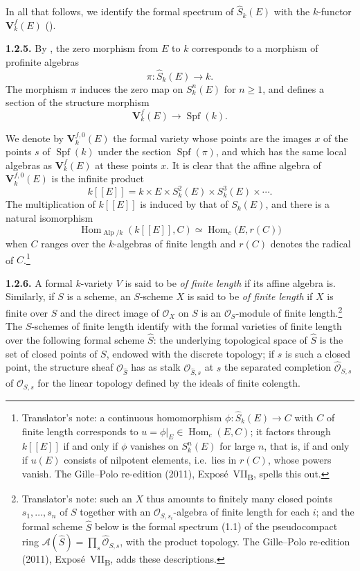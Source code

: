 In all that follows, we identify the formal spectrum of
\(\widehat S_k(E)\) with the \(k\)-functor \(\mathbf V^f_k(E)\)
().

\medskip
\noindent\textbf{1.2.5.}
\label{sga3:VIIB:1.2.5}
By , the zero morphism from \(E\) to \(k\) corresponds to a
morphism of profinite algebras
\[
  \pi:\widehat S_k(E)\longrightarrow k.
\]
The morphism \(\pi\) induces the zero map on \(S_k^n(E)\) for
\(n\geq1\), and defines a section of the structure morphism
\[
  \mathbf V^f_k(E)\longrightarrow\operatorname{Spf}(k).
\]

We denote by \(\mathbf V^{f,0}_k(E)\) the formal variety whose points
are the images \(x\) of the points \(s\) of \(\operatorname{Spf}(k)\) under
the section \(\operatorname{Spf}(\pi)\), and which has the same local
algebras as \(\mathbf V^f_k(E)\) at these points \(x\). It is clear that
the affine algebra of \(\mathbf V^{f,0}_k(E)\) is the infinite product
\[
  k[[E]]
  =
  k\times E\times S_k^2(E)\times S_k^3(E)\times\cdots.
\]
The multiplication of \(k[[E]]\) is induced by that of \(S_k(E)\), and
there is a natural isomorphism
\[
  \operatorname{Hom}_{\operatorname{Alp}/k}(k[[E]],C)
  \simeq
  \operatorname{Hom}_c\bigl(E,r(C)\bigr)
\]
when \(C\) ranges over the \(k\)-algebras of finite length and \(r(C)\)
denotes the radical of \(C\).\footnote{Translator's note: a continuous homomorphism
\(\phi\colon\widehat S_k(E)\to C\) with \(C\) of finite length corresponds to \(u=\phi|_E\in
\operatorname{Hom}_c(E,C)\); it factors through \(k[[E]]\) if and only if \(\phi\) vanishes on
\(S^n_k(E)\) for large \(n\), that is, if and only if \(u(E)\) consists of nilpotent elements, i.e.\ lies
in \(r(C)\), whose powers vanish. The Gille--Polo re-edition (2011), Expos\'e~VII\textsubscript{B}, spells
this out.}

\medskip
\noindent\textbf{1.2.6.}
\label{sga3:VIIB:1.2.6}
A formal \(k\)-variety \(V\) is said to be \emph{of finite length} if
its affine algebra is. Similarly, if \(S\) is a scheme, an \(S\)-scheme
\(X\) is said to be \emph{of finite length} if \(X\) is finite over \(S\)
and the direct image of \(\mathcal O_X\) on \(S\) is an
\(\mathcal O_S\)-module of finite length.\footnote{Translator's note: such an \(X\) thus amounts to finitely
many closed points \(s_1,\ldots,s_n\) of \(S\) together with an \(\mathcal O_{S,s_i}\)-algebra of finite
length for each \(i\); and the formal scheme \(\widehat S\) below is the formal spectrum (1.1) of the
pseudocompact ring \(\mathcal A(\widehat S)=\prod_s\widehat{\mathcal O}_{S,s}\), with the product topology.
The Gille--Polo re-edition (2011), Expos\'e~VII\textsubscript{B}, adds these descriptions.} The
\(S\)-schemes of finite length identify with the formal varieties of
finite length over the following formal scheme \(\widehat S\): the
underlying topological space of \(\widehat S\) is the set of closed
points of \(S\), endowed with the discrete topology; if \(s\) is such a
closed point, the structure sheaf \(\mathcal O_{\widehat S}\) has as
stalk \(\mathcal O_{\widehat S,s}\) at \(s\) the separated completion
\(\widehat{\mathcal O}_{S,s}\) of \(\mathcal O_{S,s}\) for the linear
topology defined by the ideals of finite colength.

